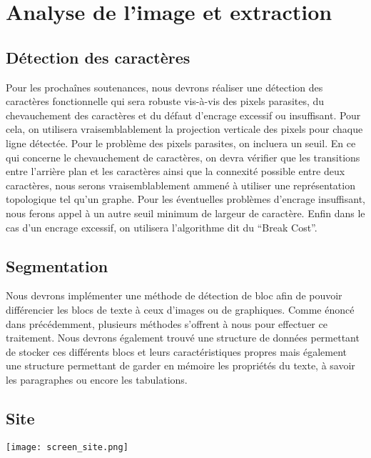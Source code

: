 \documentclass[]{report}
\begin{document}
\chapter{Analyse de l'image et extraction} %
\label{cha:analyse_de_l'image_et_extraction}

    \section{D\'etection des caractères} %
    \label{sec:d'etection_des_caractères}
      Pour les prochaînes soutenances, nous devrons réaliser une détection des caractères fonctionnelle qui sera robuste vis-à-vis des pixels parasites, du chevauchement des caractères et du défaut d'encrage excessif ou insuffisant. Pour cela, on utilisera vraisemblablement la projection verticale des pixels pour chaque ligne détectée. Pour le problème des pixels parasites, on incluera un seuil. En ce qui concerne le  chevauchement de caractères, on devra vérifier que les transitions entre l'arrière plan et les caractères ainsi que la connexité possible entre deux caractères, nous serons vraisemblablement ammené à utiliser une représentation topologique tel qu'un graphe. Pour les éventuelles problèmes d'encrage insuffisant, nous ferons appel à un autre seuil minimum de largeur de caractère. Enfin dans le cas d'un encrage excessif, on utilisera l'algorithme dit du ``Break Cost''.


    \section{Segmentation} %
    \label{sec:s\'egmentation}
  		Nous devrons implémenter une méthode de détection de bloc afin de pouvoir différencier les blocs de texte à ceux d'images ou de graphiques. Comme énoncé dans précédemment, plusieurs méthodes s'offrent à nous pour effectuer ce traitement. Nous devrons également trouvé une structure de données permettant de stocker ces différents blocs et leurs caractéristiques propres mais également une structure permettant de garder en mémoire les propriétés du texte, à savoir les paragraphes ou encore les tabulations.




\appendix

\section{Site} %
\label{sec:site}
	\texttt{[image: screen\_site.png]}
  



\end{document}
